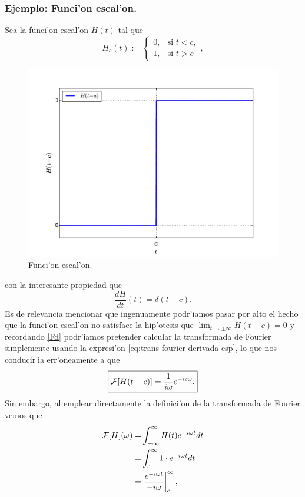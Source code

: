 \subsubsection{Ejemplo: Funci'on escal'on.}
Sea la funci'on escal'on $H(t)$ tal que
\begin{equation}
H_c(t) := 
\begin{cases}
0, &\text{si }t < c,\\
1, &\text{si }t > c
\end{cases},
\end{equation}

\begin{figure}[h]
\centering
\includegraphics[scale=0.4]{figs/fig-funcion-escalon.pdf}
\caption{Funci'on escal'on.}
\label{im:escalon}
\end{figure}
con la interesante propiedad que
\begin{equation}
\frac{dH}{dt}(t) = \delta(t-c).
\end{equation}
Es de relevancia mencionar que ingenuamente podr'iamos pasar por alto el hecho que la funci'on escal'on no satisface la hip'otesis que $\lim_{t\to\pm\infty}H(t-c)=0$ y recordando \eqref{Fd} podr'iamos pretender calcular la transformada de Fourier simplemente usando la expresi'on \eqref{eq:trans-fourier-derivada-esp}, lo que nos conducir'ia err'oneamente a que
\begin{equation}
\boxed{ {\cal F}[H(t-c)] =\frac{1}{i\omega} e^{-i c\omega}.}
\end{equation}
Sin embargo, al emplear directamente la definici'on de la transformada de Fourier vemos que
\begin{align}
{\cal F}[H](\omega)=&\int_{-\infty}^{\infty}H(t)e^{-i\omega t}dt\notag \\
=&\int_{c}^{\infty}1\cdot e^{-i\omega t}dt\notag \\
=&\left.\frac{e^{-i\omega t}}{-i\omega}\right|_{c}^{\infty}, \label{TFH}
\end{align}
